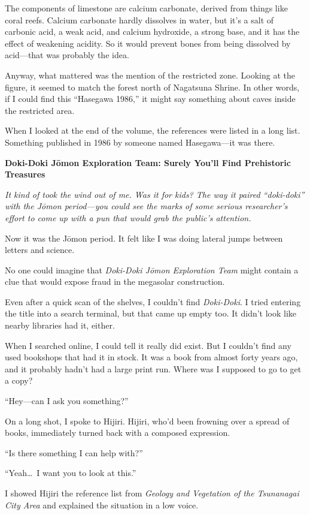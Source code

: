 \documentclass[
    a4paper,
    12pt,
    twoside,
    openany,
    UTF8,
    fontset=windows
]{ctexbook}
\begin{document}
The components of limestone are calcium carbonate, derived from things like coral reefs. Calcium carbonate hardly dissolves in water, but it's a salt of carbonic acid, a weak acid, and calcium hydroxide, a strong base, and it has the effect of weakening acidity. So it would prevent bones from being dissolved by acid---that was probably the idea.

Anyway, what mattered was the mention of the restricted zone. Looking at the figure, it seemed to match the forest north of Nagatsuna Shrine. In other words, if I could find this ``Hasegawa 1986,'' it might say something about caves inside the restricted area.

When I looked at the end of the volume, the references were listed in a long list. Something published in 1986 by someone named Hasegawa---it was there.

\textbf{Doki-Doki J\=omon Exploration Team: Surely You'll Find Prehistoric Treasures}

\textit{It kind of took the wind out of me. Was it for kids? The way it paired ``doki-doki'' with the J\=omon period---you could see the marks of some serious researcher's effort to come up with a pun that would grab the public's attention.}

Now it was the J\=omon period. It felt like I was doing lateral jumps between letters and science.

No one could imagine that \textit{Doki-Doki J\=omon Exploration Team} might contain a clue that would expose fraud in the megasolar construction.

Even after a quick scan of the shelves, I couldn't find \textit{Doki-Doki}. I tried entering the title into a search terminal, but that came up empty too. It didn't look like nearby libraries had it, either.

When I searched online, I could tell it really did exist. But I couldn't find any used bookshops that had it in stock. It was a book from almost forty years ago, and it probably hadn't had a large print run. Where was I supposed to go to get a copy?

``Hey---can I ask you something?''

On a long shot, I spoke to Hijiri. Hijiri, who'd been frowning over a spread of books, immediately turned back with a composed expression.

``Is there something I can help with?''

``Yeah\dots\ I want you to look at this.''

I showed Hijiri the reference list from \textit{Geology and Vegetation of the Tsunanagai City Area} and explained the situation in a low voice.
\end{document}
